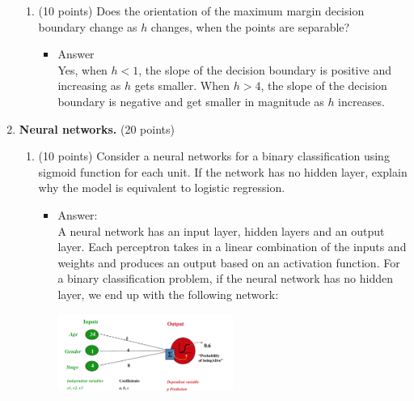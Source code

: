 \documentclass[twoside,10pt]{article}
\begin{document}
\begin{enumerate}
\begin{enumerate}
\item (10 points) Does the orientation of the maximum margin decision boundary change as $h$ changes, when the points are separable?
\begin{itemize}
\item Answer\\
Yes, when $h<1$, the slope of the decision boundary is positive and increasing as $h$ gets smaller. When $h>4$, the slope of the decision boundary is negative and get smaller in magnitude as $h$ increases.
\end{itemize}
\end{enumerate}



\item {\bf Neural networks.} (20 points)

\begin{enumerate}
\item (10 points)
Consider a neural networks for a binary classification using sigmoid function for each unit. If the network has no hidden layer, explain why the model is equivalent to logistic regression. 
\begin{itemize}
\item Answer:\\
A neural network has an input layer, hidden layers and an output layer. Each perceptron takes in a linear combination of the inputs and weights and produces an output based on an activation function. For a binary classification problem, if the neural network has no hidden layer, we end up with the following network:
\begin{center}
\includegraphics[width = 0.5\textwidth]{NeuralNet.png}
\end{center}


\end{itemize}
\end{enumerate}
\end{enumerate}
\end{document}
